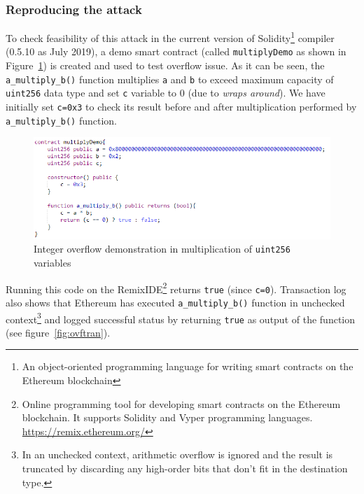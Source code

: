 \subsubsection{Reproducing the attack}
To check feasibility of this attack in the current version of Solidity\footnote{An object-oriented programming language for writing smart contracts on the Ethereum blockchain} compiler (0.5.10 as July 2019), a demo smart contract (called \texttt{multiplyDemo} as shown in Figure~\ref{fig:ovfdemo}) is created and used to test overflow issue. As it can be seen, the \texttt{a\_multiply\_b()} function multiplies \texttt{a} and \texttt{b} to exceed maximum capacity of \texttt{uint256} data type and set \texttt{c} variable to 0 (due to \textit{wraps around}). We have initially set \texttt{c=0x3} to check its result before and after multiplication performed by \texttt{a\_multiply\_b()} function. 
\begin{figure}[t]
	\centering
	\includegraphics[width=1.0\linewidth]{figures/img05.png}
	\caption{Integer overflow demonstration in multiplication of \texttt{uint256} variables}
	\label{fig:ovfdemo}
\end{figure}

Running this code on the RemixIDE\footnote{Online programming tool for developing smart contracts on the Ethereum blockchain. It supports Solidity and Vyper programming languages. \url{https://remix.ethereum.org/}} returns \texttt{true} (since \texttt{c=0}). Transaction log also shows that Ethereum has executed \texttt{a\_multiply\_b()} function in unchecked context\footnote{In an unchecked context, arithmetic overflow is ignored and the result is truncated by discarding any high-order bits that don't fit in the destination type.} and logged successful status by returning \texttt{true} as output of the function (see figure~\ref{fig:ovftran}).

